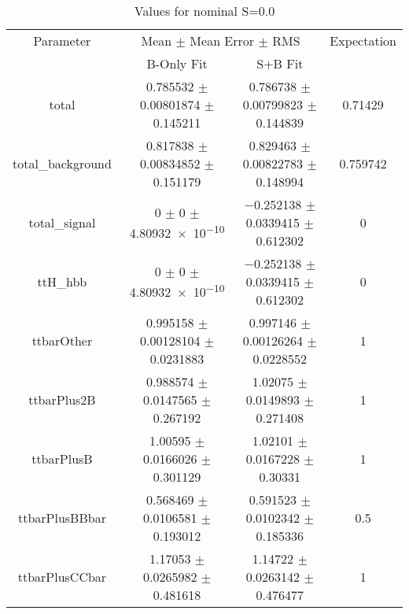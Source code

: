 \begin{table}
\centering
\caption{Values for nominal S=0.0}
\begin{tabular}{cccc}
\toprule
Parameter & \multicolumn{2}{c}{Mean $\pm$ Mean Error $\pm$ RMS} & Expectation\\
 & B-Only Fit & S+B Fit & \\
\midrule
total & \num{0.785532} $\pm$ \num{0.00801874} $\pm$ \num{0.145211} & \num{0.786738} $\pm$ \num{0.00799823} $\pm$ \num{0.144839} & \num{0.71429}\\
total\_background & \num{0.817838} $\pm$ \num{0.00834852} $\pm$ \num{0.151179} & \num{0.829463} $\pm$ \num{0.00822783} $\pm$ \num{0.148994} & \num{0.759742}\\
total\_signal & \num{0} $\pm$ \num{0} $\pm$ \num{4.80932e-10} & \num{-0.252138} $\pm$ \num{0.0339415} $\pm$ \num{0.612302} & \num{0}\\
ttH\_hbb & \num{0} $\pm$ \num{0} $\pm$ \num{4.80932e-10} & \num{-0.252138} $\pm$ \num{0.0339415} $\pm$ \num{0.612302} & \num{0}\\
ttbarOther & \num{0.995158} $\pm$ \num{0.00128104} $\pm$ \num{0.0231883} & \num{0.997146} $\pm$ \num{0.00126264} $\pm$ \num{0.0228552} & \num{1}\\
ttbarPlus2B & \num{0.988574} $\pm$ \num{0.0147565} $\pm$ \num{0.267192} & \num{1.02075} $\pm$ \num{0.0149893} $\pm$ \num{0.271408} & \num{1}\\
ttbarPlusB & \num{1.00595} $\pm$ \num{0.0166026} $\pm$ \num{0.301129} & \num{1.02101} $\pm$ \num{0.0167228} $\pm$ \num{0.30331} & \num{1}\\
ttbarPlusBBbar & \num{0.568469} $\pm$ \num{0.0106581} $\pm$ \num{0.193012} & \num{0.591523} $\pm$ \num{0.0102342} $\pm$ \num{0.185336} & \num{0.5}\\
ttbarPlusCCbar & \num{1.17053} $\pm$ \num{0.0265982} $\pm$ \num{0.481618} & \num{1.14722} $\pm$ \num{0.0263142} $\pm$ \num{0.476477} & \num{1}\\
\bottomrule
\end{tabular}
\end{table}
